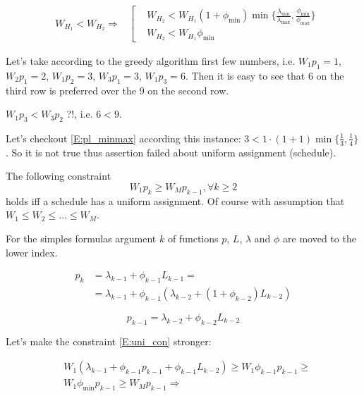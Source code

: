 \documentclass{amsart}
\begin{document}
\begin{equation}
  \begin{aligned}
    & W_{H_1} < W_{H_2} \Rightarrow
    & \left[
      \begin{aligned}
        & W_{H_2} < W_{H_1} (1 + \phi_{\min})
          \min\{
            \frac{\lambda_{\min}}
              {\lambda_{\max}},
            \frac{\phi_{\min}}
              {\phi_{\max}}
          \} \\
        & W_{H_2} < W_{H_1} \phi_{\min}
      \end{aligned}
    \right.
  \end{aligned}
\end{equation}

Let's take according to the greedy algorithm first few numbers, i.e.
$W_1p_1=1$, $W_2p_1=2$, $W_1p_2=3$, $W_3p_1=3$, $W_1p_3=6$.
Then it is easy to see that 6 on the third row is preferred over
the 9 on the second row.

\begin{center}$W_1p_3 < W_3p_2$ ?!, i.e. $6 < 9$.\end{center}

Let's checkout \eqref{E:pl_minmax} according this instance:
$3 < 1 \cdot (1 + 1) \min \{ \frac{1}{3}, \frac{1}{4} \}$.
So it is not true thus assertion failed about uniform assignment (schedule).

The following constraint
\begin{equation}\label{E:uni_con}
  W_1p_k \geqslant W_Mp_{k-1}, \forall k \geqslant 2
\end{equation}
holds iff a schedule has a uniform assignment. Of course with
assumption that $W_1 \leqslant W_2 \leqslant \dots \leqslant W_M$.

For the simples formulas argument $k$ of functions $p$, $L$, $\lambda$
and $\phi$ are moved to the lower index.

\[
  \begin{aligned}
    p_k & = \lambda_{k-1} + \phi_{k-1}L_{k-1} = \\
        & = \lambda_{k-1} + \phi_{k-1}
          ( \lambda_{k-2} + (1+\phi_{k-2})L_{k-2} )
  \end{aligned}
\]

\[
  p_{k-1} = \lambda_{k-2} + \phi_{k-2}L_{k-2}
\]

Let's make the constraint \eqref{E:uni_con} stronger:

\[
  \begin{aligned}
    & W_1(\lambda_{k-1} + \phi_{k-1}p_{k-1} + \phi_{k-1}L_{k-2}) \geqslant
        W_1\phi_{k-1}p_{k-1} \geqslant \\
    & W_1\phi_{\min}p_{k-1} \geqslant W_Mp_{k-1} \Rightarrow
  \end{aligned}
\]
\end{document}
